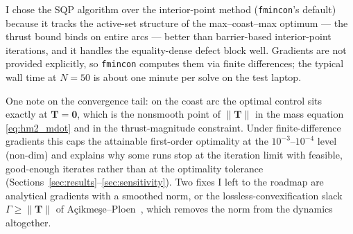 \documentclass[../main.tex]{subfiles}
\begin{document}
I chose the SQP algorithm over the interior-point method (\texttt{fmincon}'s default) because it tracks the active-set structure of the max--coast--max optimum --- the thrust bound binds on entire arcs --- better than barrier-based interior-point iterations, and it handles the equality-dense defect block well. Gradients are not provided explicitly, so \texttt{fmincon} computes them via finite differences; the typical wall time at $N = 50$ is about one minute per solve on the test laptop.

One note on the convergence tail: on the coast arc the optimal control sits exactly at $\mathbf{T} = \mathbf{0}$, which is the nonsmooth point of $\|\mathbf{T}\|$ in the mass equation \eqref{eq:hm2_mdot} and in the thrust-magnitude constraint. Under finite-difference gradients this caps the attainable first-order optimality at the $10^{-3}$--$10^{-4}$ level (non-dim) and explains why some runs stop at the iteration limit with feasible, good-enough iterates rather than at the optimality tolerance (Sections~\ref{sec:results}--\ref{sec:sensitivity}). Two fixes I left to the roadmap are analytical gradients with a smoothed norm, or the lossless-convexification slack $\Gamma \geq \|\mathbf{T}\|$ of A\c{c}ikme\c{s}e--Ploen~\cite{acikmese2007}, which removes the norm from the dynamics altogether.
\end{document}
